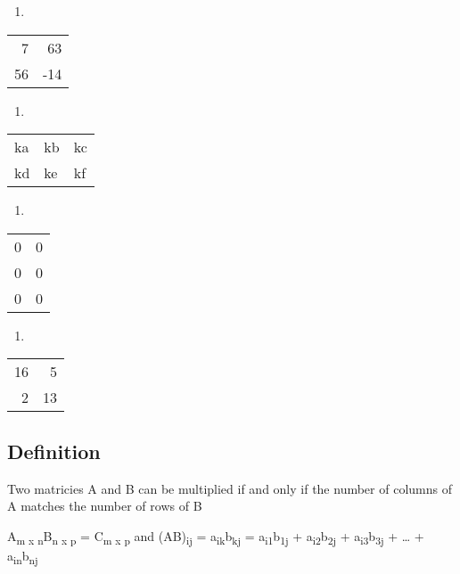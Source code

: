 \documentclass[11pt]{article}
\begin{document}
\begin{enumerate}
\item 
\end{enumerate}
\begin{center}
\begin{tabular}{rr}
7 & 63\\
56 & -14\\
\end{tabular}
\end{center}
\begin{enumerate}
\item 
\end{enumerate}
\begin{center}
\begin{tabular}{lll}
ka & kb & kc\\
kd & ke & kf\\
\end{tabular}
\end{center}
\begin{enumerate}
\item 
\end{enumerate}
\begin{center}
\begin{tabular}{rr}
0 & 0\\
0 & 0\\
0 & 0\\
\end{tabular}
\end{center}
\begin{enumerate}
\item 
\end{enumerate}
\begin{center}
\begin{tabular}{rr}
16 & 5\\
2 & 13\\
\end{tabular}
\end{center}
\subsection{Definition}
\label{sec:org3f7c228}
Two matricies A and B can be multiplied if and only if the number of columns of A matches the number of rows of B

A\textsubscript{m x n}B\textsubscript{n x p} = C\textsubscript{m x p}
and (AB)\textsubscript{ij} = a\textsubscript{ik}b\textsubscript{kj} = a\textsubscript{i1}b\textsubscript{1j} + a\textsubscript{i2}b\textsubscript{2j} + a\textsubscript{i3}b\textsubscript{3j} + \ldots{} + a\textsubscript{in}b\textsubscript{nj}
\end{document}
